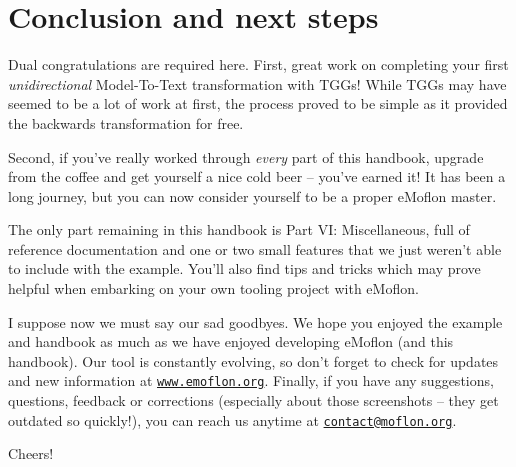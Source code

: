 \newpage
\section{Conclusion and next steps}
\genHeader

Dual congratulations are required here. First, great work on completing your first \emph{unidirectional} Model-To-Text transformation with TGGs! While TGGs
may have seemed to be a lot of work at first, the process proved to be simple as it provided the backwards transformation for free.

Second, if you've really worked through \emph{every} part of this handbook, upgrade from the coffee and get yourself a nice cold beer -- you've earned it! It
has been a long journey, but you can now consider yourself to be a proper eMoflon master.

The only part remaining in this handbook is Part VI: Miscellaneous, full of reference documentation and one or two small features that we just weren't able to
include with the example. You'll also find tips and tricks which may prove helpful when embarking on your own tooling project with eMoflon.

I suppose now we must say our sad goodbyes. We hope you enjoyed the example and handbook as much as we have enjoyed developing eMoflon (and this handbook). Our
tool is constantly evolving, so don't forget to check for updates and new information at \texttt{\url{www.emoflon.org}}. Finally, if you have any suggestions,
questions, feedback or corrections (especially about those screenshots -- they get outdated so quickly!), you can reach us anytime at
\texttt{\href{mailto:contact@moflon.org}{contact@moflon.org}}.

Cheers!
